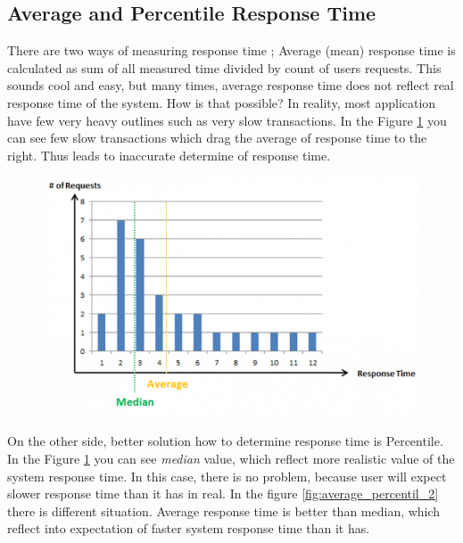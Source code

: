 \subsection*{Average and Percentile Response Time}
There are two ways of measuring response time \cite{Kopp:RPT}; Average (mean) response time is calculated as sum of all measured time divided by count of users requests. This sounds cool and easy, but many times, average response time does not reflect real response time of the system. How is that possible? In reality, most application have few very heavy outlines such as very slow transactions. In the Figure \ref{fig:average_percentil_1} you can see few slow transactions which drag the average of response time to the right. Thus leads to inaccurate determine of response time.


\begin{figure}[H]
  \centering
  \includegraphics[width=15cm]{obrazky-figures/average_vs_percentile_1.png}
  \caption{}
  \label{fig:average_percentil_1}
\end{figure}

On the other side, better solution how to determine response time is Percentile. In the Figure \ref{fig:average_percentil_1} you can see \emph{median} value, which reflect more realistic value of the system response time. In this case, there is no problem, because user will expect slower response time than it has in real. In the figure \ref{fig:average_percentil_2} there is different situation. Average response time is better than median, which reflect into expectation of faster system response time than it has.

